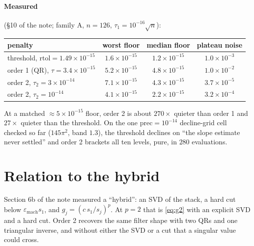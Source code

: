 \documentclass[11pt]{article}
\theoremstyle{definition}
\theoremstyle{remark}
\newcommand{\pr}{\mathrm{prec}}
\newcommand{\eps}{\varepsilon_{\mathrm{mach}}}
\begin{document}
\paragraph{Measured} (\S10 of the note; family A, $n=126$, $\tau_1 = 10^{-16}\sqrt n$):
\begin{center}
\begin{tabular}{lccc}
\toprule
penalty & worst floor & median floor & plateau noise\\
\midrule
threshold, $\mathrm{rtol}=1.49\times10^{-15}$ & $1.6\times10^{-15}$ & $1.2\times10^{-15}$ & $1.0\times10^{-3}$\\
order 1 (QR), $\tau = 3.4\times10^{-15}$     & $5.2\times10^{-15}$ & $4.8\times10^{-15}$ & $1.0\times10^{-2}$\\
order 2, $\tau_2 = 3\times10^{-14}$          & $7.1\times10^{-15}$ & $4.3\times10^{-15}$ & $3.7\times10^{-5}$\\
order 2, $\tau_2 = 10^{-14}$                 & $4.1\times10^{-15}$ & $2.2\times10^{-15}$ & $3.2\times10^{-4}$\\
\bottomrule
\end{tabular}
\end{center}
At a matched $\approx5\times10^{-15}$ floor, order 2 is about $270\times$ quieter than order 1 and
$27\times$ quieter than the threshold. On the one $\pr=10^{-14}$ decline-grid cell checked so far
($145\pi^2$, band $1.3$), the threshold declines on ``the slope estimate never settled'' and order 2
brackets all ten levels, pure, in $280$ evaluations.

\section{Relation to the hybrid}

Section 6b of the note measured a ``hybrid'': an SVD of the stack, a hard cut below $\eps s_1$, and
$g_j = (c\,s_1/s_j)^p$. At $p=2$ that is \eqref{eq:g2} with an explicit SVD and a hard cut. Order 2
recovers the same filter shape with two QRs and one triangular inverse, and without either the SVD
or a cut that a singular value could cross.
\end{document}
